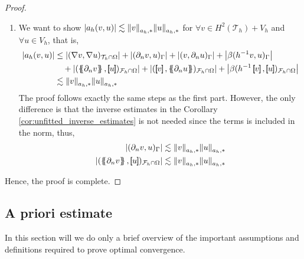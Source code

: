 \begin{proof}
\begin{enumerate}[label=\arabic*)]
\item We want to show $\left\lvert  a_{h}( v,u)  \right\rvert  \lesssim \| v \|_{ a_{h},* }^{  }  \| u \|_{ a_{h},* }^{  }$
for $ \forall v \in  H^{2}( \mathcal{T}_{h} ) + V_{h} $ and $ \forall u \in V_{h}$,
    that is,      \[
        \begin{split}
    \left\lvert a_{h}( v,u)  \right\rvert & \le  \left\lvert( \nabla v, \nabla u)_{\mathcal{T} _{h} \cap \Omega }  \right\rvert +  \left\lvert  ( \partial _{n} v,u)_{\Gamma } \right\rvert   + \left\lvert ( v, \partial _{n} u)_{\Gamma } \right\rvert  +
    \left\lvert\beta ( h^{-1} v,u)_{\Gamma }  \right\rvert  \\
    & \quad  + \left\lvert( \mean{ \partial _{n} v }  , \jump{ u }  ) _{\mathcal{F} _{h} \cap \Omega }  \right\rvert  + \left\lvert ( \jump{ v }  , \mean{ \partial _{n} u }  )_{\mathcal{F} _{h}\cap \Omega } \right\rvert  + \left\lvert \beta ( h^{-1} \jump{ v }  ,
    \jump{ u }  )_{\mathcal{F}_{h}\cap \Omega  } \right\rvert \\
     & \lesssim  \| v \|_{ a_{h},* }^{  }  \| u \|_{ a_{h},* }^{  }
        \end{split}
    \]
    The proof follows exactly the same steps as the first part. However, the only difference is that the inverse estimates in the Corollary \ref{cor:unfitted_inverse_estimates} is not needed since the terms is included in the norm, thus, \[
        \begin{split}
    \abs{ ( \partial _{n} v, u) _{\Gamma } } & \lesssim \| v \|_{ a_{h},* }^{  } \| u \|_{a_{h},*  }^{  } \\
    \abs{ ( \mean{ \partial _{n} v  }  , \jump{ u }  ) _{\mathcal{F} _{h} \cap \Omega  } } & \lesssim \| v \|_{ a_{h},* }^{  } \| u \|_{a_{h},*  }^{  }
        \end{split}
    \]

    \end{enumerate}

    Hence, the proof is complete.



\end{proof}

\subsection{A priori estimate}%
\label{sub:a_priori_estimate}

In this section will we do only a brief overview of the important assumptions and definitions required to prove optimal convergence.


